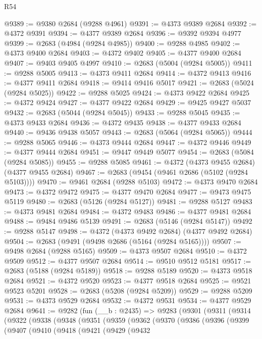 \begin{lexlean}{R54}
\begin{coremodule}
@9389 := @9380 @2684 (@9288 @4961)
@9391 := @4373 @9389 @2684
@9392 := @4372 @9391
@9394 := @4377 @9389 @2684
@9396 := @9392 @9394 @4977
@9399 := @2683 (@4984 (@9284 @4985))
@9400 := @9288 @4985
@9402 := @4373 @9400 @2684
@9403 := @4372 @9402
@9405 := @4377 @9400 @2684
@9407 := @9403 @9405 @4997
@9410 := @2683 (@5004 (@9284 @5005))
@9411 := @9288 @5005
@9413 := @4373 @9411 @2684
@9414 := @4372 @9413
@9416 := @4377 @9411 @2684
@9418 := @9414 @9416 @5017
@9421 := @2683 (@5024 (@9284 @5025))
@9422 := @9288 @5025
@9424 := @4373 @9422 @2684
@9425 := @4372 @9424
@9427 := @4377 @9422 @2684
@9429 := @9425 @9427 @5037
@9432 := @2683 (@5044 (@9284 @5045))
@9433 := @9288 @5045
@9435 := @4373 @9433 @2684
@9436 := @4372 @9435
@9438 := @4377 @9433 @2684
@9440 := @9436 @9438 @5057
@9443 := @2683 (@5064 (@9284 @5065))
@9444 := @9288 @5065
@9446 := @4373 @9444 @2684
@9447 := @4372 @9446
@9449 := @4377 @9444 @2684
@9451 := @9447 @9449 @5077
@9454 := @2683 (@5084 (@9284 @5085))
@9455 := @9288 @5085
@9461 := @4372 (@4373 @9455 @2684) (@4377 @9455 @2684)
@9467 := @2683 (@9454 (@9461 @2686 (@5102 (@9284 @5103))))
@9470 := @9461 @2684 (@9288 @5103)
@9472 := @4373 @9470 @2684
@9473 := @4372 @9472
@9475 := @4377 @9470 @2684
@9477 := @9473 @9475 @5119
@9480 := @2683 (@5126 (@9284 @5127))
@9481 := @9288 @5127
@9483 := @4373 @9481 @2684
@9484 := @4372 @9483
@9486 := @4377 @9481 @2684
@9488 := @9484 @9486 @5139
@9491 := @2683 (@5146 (@9284 @5147))
@9492 := @9288 @5147
@9498 := @4372 (@4373 @9492 @2684) (@4377 @9492 @2684)
@9504 := @2683 (@9491 (@9498 @2686 (@5164 (@9284 @5165))))
@9507 := @9498 @2684 (@9288 @5165)
@9509 := @4373 @9507 @2684
@9510 := @4372 @9509
@9512 := @4377 @9507 @2684
@9514 := @9510 @9512 @5181
@9517 := @2683 (@5188 (@9284 @5189))
@9518 := @9288 @5189
@9520 := @4373 @9518 @2684
@9521 := @4372 @9520
@9523 := @4377 @9518 @2684
@9525 := @9521 @9523 @5201
@9528 := @2683 (@5208 (@9284 @5209))
@9529 := @9288 @5209
@9531 := @4373 @9529 @2684
@9532 := @4372 @9531
@9534 := @4377 @9529 @2684
@9641 := @9282
    (fun (__b : @2435) =>
    @9283
      (@9301
        (@9311
          (@9314
            (@9322
              (@9338
                (@9348
                  (@9351
                    (@9359
                      (@9362
                        (@9370
                          (@9386
                            (@9396
                              (@9399
                                (@9407
                                  (@9410
                                    (@9418
                                      (@9421
                                        (@9429
                                          (@9432

\end{coremodule}
\end{lexlean}

